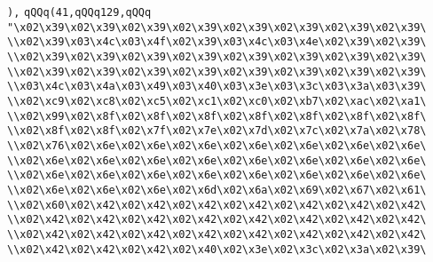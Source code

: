 \verb|),|\newline
\verb|qQQq(41,qQQq129,qQQq|\newline
\verb|"\x02\x39\x02\x39\x02\x39\x02\x39\x02\x39\x02\x39\x02\x39\x02\x39\|\newline
\verb|\\x02\x39\x03\x4c\x03\x4f\x02\x39\x03\x4c\x03\x4e\x02\x39\x02\x39\|\newline
\verb|\\x02\x39\x02\x39\x02\x39\x02\x39\x02\x39\x02\x39\x02\x39\x02\x39\|\newline
\verb|\\x02\x39\x02\x39\x02\x39\x02\x39\x02\x39\x02\x39\x02\x39\x02\x39\|\newline
\verb|\\x03\x4c\x03\x4a\x03\x49\x03\x40\x03\x3e\x03\x3c\x03\x3a\x03\x39\|\newline
\verb|\\x02\xc9\x02\xc8\x02\xc5\x02\xc1\x02\xc0\x02\xb7\x02\xac\x02\xa1\|\newline
\verb|\\x02\x99\x02\x8f\x02\x8f\x02\x8f\x02\x8f\x02\x8f\x02\x8f\x02\x8f\|\newline
\verb|\\x02\x8f\x02\x8f\x02\x7f\x02\x7e\x02\x7d\x02\x7c\x02\x7a\x02\x78\|\newline
\verb|\\x02\x76\x02\x6e\x02\x6e\x02\x6e\x02\x6e\x02\x6e\x02\x6e\x02\x6e\|\newline
\verb|\\x02\x6e\x02\x6e\x02\x6e\x02\x6e\x02\x6e\x02\x6e\x02\x6e\x02\x6e\|\newline
\verb|\\x02\x6e\x02\x6e\x02\x6e\x02\x6e\x02\x6e\x02\x6e\x02\x6e\x02\x6e\|\newline
\verb|\\x02\x6e\x02\x6e\x02\x6e\x02\x6d\x02\x6a\x02\x69\x02\x67\x02\x61\|\newline
\verb|\\x02\x60\x02\x42\x02\x42\x02\x42\x02\x42\x02\x42\x02\x42\x02\x42\|\newline
\verb|\\x02\x42\x02\x42\x02\x42\x02\x42\x02\x42\x02\x42\x02\x42\x02\x42\|\newline
\verb|\\x02\x42\x02\x42\x02\x42\x02\x42\x02\x42\x02\x42\x02\x42\x02\x42\|\newline
\verb|\\x02\x42\x02\x42\x02\x42\x02\x40\x02\x3e\x02\x3c\x02\x3a\x02\x39\|\newline
